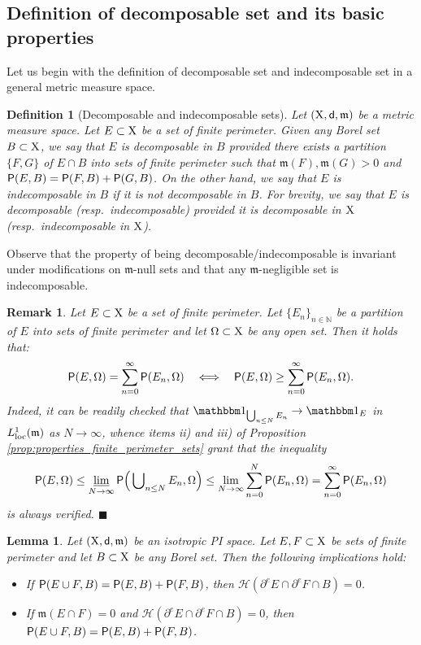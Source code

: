 \documentclass[reqno]{amsart}
\numberwithin{equation}{section}
\newcommand{\N}{\mathbb{N}}
\newcommand{\X}{{\rm X}}
\newcommand{\sfd}{{\sf d}}
\newcommand{\mm}{\mathfrak m}
\newcommand{\1}{\mathbbm 1}
\newcommand{\limi}{\varliminf}
\newcommand{\loc}{{\rm loc}}
\renewcommand{\P}{{\sf P}}
\renewcommand{\H}{{\mathcal H}}
\newcommand{\fr}{\penalty-20\null\hfill\(\blacksquare\)}
\newtheorem{lemma}[theorem]{Lemma}
\newtheorem{definition}[theorem]{Definition}
\newtheorem{remark}[theorem]{Remark}
\begin{document}
\subsection{Definition of decomposable set and its basic properties}
\label{ss:decomposable_def}
%
%
Let us begin with the definition of decomposable set and
indecomposable set in a general metric measure space.
%
%
\begin{definition}[Decomposable and indecomposable sets]
Let \((\X,\sfd,\mm)\) be a metric measure space. Let \(E\subset\X\)
be a set of finite perimeter. Given any Borel set \(B\subset\X\),
we say that \(E\) is \emph{decomposable in \(B\)} provided there
exists a partition \(\{F,G\}\) of \(E\cap B\) into sets of finite
perimeter such that \(\mm(F),\mm(G)>0\) and \(\P(E,B)=\P(F,B)+\P(G,B)\).
On the other hand, we say that \(E\) is \emph{indecomposable in \(B\)}
if it is not decomposable in \(B\). For brevity, we say that \(E\) is
\emph{decomposable} (resp.\ \emph{indecomposable}) provided it is
decomposable in \(\X\) (resp.\ indecomposable in \(\X\)).
\end{definition}
%
%
Observe that the property of being decomposable/indecomposable is invariant
under modifications on \(\mm\)-null sets and that any \(\mm\)-negligible set
is indecomposable.
%
%
\begin{remark}\label{rmk:ineq_perim}{\rm
Let \(E\subset\X\) be a set of finite perimeter.
Let \(\{E_n\}_{n\in\N}\) be a partition of \(E\) into sets of finite perimeter
and let \(\Omega\subset\X\) be any open set. Then it holds that:
\[
\P(E,\Omega)=\sum_{n=0}^\infty\P(E_n,\Omega)
\quad\Longleftrightarrow\quad
\P(E,\Omega)\geq\sum_{n=0}^\infty\P(E_n,\Omega).
\]
Indeed, it can be readily checked that \(\1_{\bigcup_{n\leq N}E_n}\to\1_E\)
in \(L^1_\loc(\mm)\) as \(N\to\infty\), whence items ii) and iii) of Proposition
\ref{prop:properties_finite_perimeter_sets} grant that the inequality
\[
\P(E,\Omega)\leq\limi_{N\to\infty}\P\Big(\bigcup\nolimits_{n\leq N}E_n,\Omega\Big)
\leq\lim_{N\to\infty}\sum_{n=0}^N\P(E_n,\Omega)=\sum_{n=0}^\infty\P(E_n,\Omega)
\]
is always verified.
\fr}\end{remark}
%
%
\begin{lemma}\label{lem:equiv_P_additive}
Let \((\X,\sfd,\mm)\) be an isotropic PI space. Let \(E,F\subset\X\) be sets of finite
perimeter and let \(B\subset\X\) be any Borel set. Then the following implications hold:
\begin{itemize}
\item[\(\rm i)\)] If \(\P(E\cup F,B)=\P(E,B)+\P(F,B)\), then
\(\H(\partial^e E\cap\partial^e F\cap B)=0\).
\item[\(\rm ii)\)] If \(\mm(E\cap F)=0\) and
\(\H(\partial^e E\cap\partial^e F\cap B)=0\), then \(\P(E\cup F,B)=\P(E,B)+\P(F,B)\).
\end{itemize}
\end{lemma}
\end{document}
